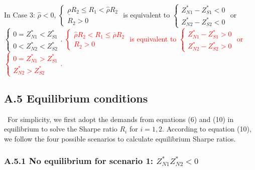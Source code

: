 \documentclass[10pt]{article}
\newcommand{\hhred}{\textcolor{red}}
\begin{document}
In Case 3: $ {\hat \rho} < 0 $, $ \left\{ \begin{matrix} \underline{\rho} R_2 \leqslant R_1 < {\hat \rho} R_2 \\ R_2 > 0 \end{matrix} \right. $ is equivalent to $ \left\{ \begin{matrix} Z_{N 1}^* - Z_{S 1}^* < 0 \\ Z_{N 2}^* - Z_{S 2}^* < 0 \end{matrix} \right. $ or $ \left\{ \begin{matrix} 0 = Z_{N 1}^* < Z_{S 1}^* \\ 0 < Z_{N 2}^* < Z_{S 2}^* \end{matrix} \right. $. \hhred{$ \left\{ \begin{matrix} {\hat \rho} R_2 < R_1 \leqslant \overline{\rho} R_2 \\ R_2 > 0 \end{matrix} \right. $ is equivalent to $ \left\{ \begin{matrix} Z_{N 1}^* - Z_{S 1}^* > 0 \\ Z_{N 2}^* - Z_{S 2}^* > 0 \end{matrix} \right. $ or $ \left\{ \begin{matrix} 0 = Z_{N 1}^* > Z_{S 1}^* \\ Z_{N 2}^* > Z_{S 2}^* \end{matrix} \right. $.}

\subsection*{A.5 \quad Equilibrium conditions}

\quad \ 
For simplicity, we first adopt the demands from equations (6) and (10) in equilibrium to solve the Sharpe ratio $ R_i $ for $ i = 1, 2 $. According to equation (10), we follow the four possible scenarios to calculate equilibrium Sharpe ratios.

\subsubsection*{A.5.1 \quad No equilibrium for scenario 1: $ Z_{N 1}^* Z_{N 2}^* < 0 $}
\end{document}
